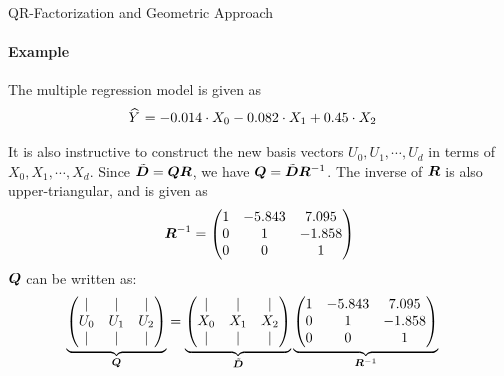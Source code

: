 \begin{frame}{QR-Factorization and Geometric Approach}
\framesubtitle{Example}
The multiple regression model is given as
\begin{align*}
       \mkern 1.5mu\widehat{\mkern-1.5muY}\mkern 1.5mu & = -0.014 \cdot X_0 -0.082 \cdot X_1 + 0.45 \cdot X_2
\end{align*}

It is also instructive to construct the new basis vectors $U_0, U_1,
\cdots, U_d$ in terms of
$X_0, X_1, \cdots, X_d$. 
Since $\tilde{{\boldsymbol D}} = {\boldsymbol Q} {\boldsymbol R}$, we have ${\boldsymbol Q} = \tilde{{\boldsymbol D}} {\boldsymbol R}^{-1}$.
The inverse of ${\boldsymbol R}$ is also upper-triangular, and is given as
\begin{align*}
    {\boldsymbol R}^{-1} = \begin{pmatrix} 
1 & -5.843 & 7.095\\
0 &   1  & -1.858\\
0 &   0  &     1
 \end{pmatrix}
\end{align*}
${\boldsymbol Q}$ can be written as:
\begin{align*}
    \underbrace{
    \begin{pmatrix} 
      | & |   &  | \\
      U_0 & U_1 & U_2\\
    |   & |   & | \\
     \end{pmatrix}}_{{\boldsymbol Q}} &
    = 
    \underbrace{
    \begin{pmatrix} 
      | & |   &  | \\
      X_0 & X_1 & X_2\\
    |   & |   & | \\
 \end{pmatrix}}_{\tilde{{\boldsymbol D}}} 
\underbrace{
\begin{pmatrix} 
1 & -5.843 & 7.095\\
0 &   1  & -1.858\\
0 &   0  &     1
 \end{pmatrix}}_{{\boldsymbol R}^{-1}}
\end{align*}
\end{frame}

